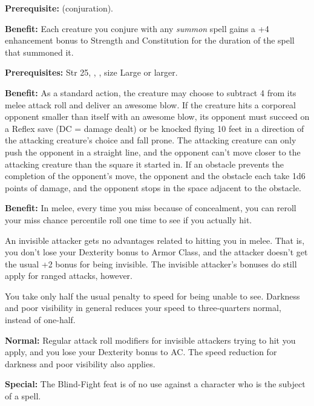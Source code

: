 
\textbf{Prerequisite:}  (conjuration).

\textbf{Benefit:} Each creature you conjure with any \textit{summon} spell gains 
a +4 enhancement bonus to Strength and Constitution for the duration of the spell 
that summoned it.


\textbf{Prerequisites:} Str 25, , , size Large or 
larger.

\textbf{Benefit:} As a standard action, the creature may choose to subtract 4 from 
its melee attack roll and deliver an awesome blow. If the creature hits a corporeal 
opponent smaller than itself with an awesome blow, its opponent must succeed on 
a Reflex save (DC = damage dealt) or be knocked flying 10 feet in a direction of 
the attacking creature's choice and fall prone. The attacking creature can only 
push the opponent in a straight line, and the opponent can't move closer to the 
attacking creature than the square it started in. If an obstacle prevents the completion 
of the opponent's move, the opponent and the obstacle each take 1d6 points of damage, 
and the opponent stops in the space adjacent to the obstacle.


\textbf{Benefit:} In melee, every time you miss because of concealment, you can 
reroll your miss chance percentile roll one time to see if you actually hit.

An invisible attacker gets no advantages related to hitting you in melee. That 
is, you don't lose your Dexterity bonus to Armor Class, and the attacker doesn't 
get the usual +2 bonus for being invisible. The invisible attacker's bonuses do 
still apply for ranged attacks, however.

You take only half the usual penalty to speed for being unable to see. Darkness 
and poor visibility in general reduces your speed to three-quarters normal, instead 
of one-half.

\textbf{Normal:} Regular attack roll modifiers for invisible attackers trying to 
hit you apply, and you lose your Dexterity bonus to AC. The speed reduction for 
darkness and poor visibility also applies.

\textbf{Special:} The Blind-Fight feat is of no use against a character who is 
the subject of a  spell.

